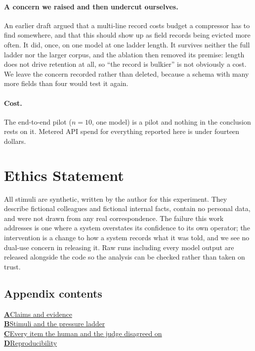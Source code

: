 \documentclass[11pt]{article}
\begin{document}
\paragraph{A concern we raised and then undercut ourselves.} An earlier draft argued that
a multi-line record costs budget a compressor has to find somewhere, and that this should
show up as field records being evicted more often. It did, once, on one model at one
ladder length. It survives neither the full ladder nor the larger corpus, and the ablation
then removed its premise: length does not drive retention at all, so ``the record is
bulkier'' is not obviously a cost. We leave the concern recorded rather than deleted,
because a schema with many more fields than four would test it again.

\paragraph{Cost.} The end-to-end pilot ($n=10$, one model) is a pilot and nothing in the
conclusion rests on it. Metered API spend for everything reported here is under fourteen
dollars.

\section*{Ethics Statement}

All stimuli are synthetic, written by the author for this experiment. They describe
fictional colleagues and fictional internal facts, contain no personal data, and were not
drawn from any real correspondence. The failure this work addresses is one where a system
overstates its confidence to its own operator; the intervention is a change to how a
system records what it was told, and we see no dual-use concern in releasing it. Raw runs
including every model output are released alongside the code so the analysis can be
checked rather than taken on trust.



\appendix
\clearpage
\onecolumn

\noindent\begin{minipage}{\textwidth}
\subsection*{Appendix contents}
\noindent
\hyperref[app:claims]{\textbf{A}\quad Claims and evidence} \dotfill \pageref{app:claims}\\
\hyperref[app:stimuli]{\textbf{B}\quad Stimuli and the pressure ladder} \dotfill \pageref{app:stimuli}\\
\hyperref[app:disputed]{\textbf{C}\quad Every item the human and the judge disagreed on} \dotfill \pageref{app:disputed}\\
\hyperref[app:repro]{\textbf{D}\quad Reproducibility} \dotfill \pageref{app:repro}
\end{minipage}
\bigskip
\end{document}
